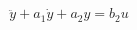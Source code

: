 \documentclass[12pt]{standalone}
\begin{document}
\begin{varwidth}{50in}
\begin{equation*}
\ddot{y} + a_1 \dot{y} + a_2 y = b_2 u
\end{equation*}
\end{varwidth}
\end{document}
